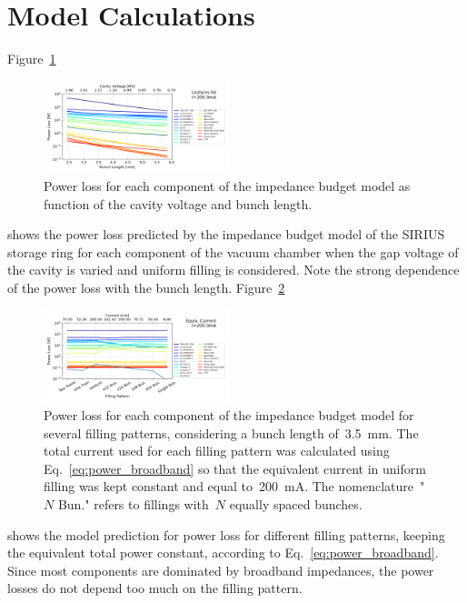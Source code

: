 \documentclass
[
    a4paper,
    nospread,     %
]{jacow}
\begin{document}
\section{Model Calculations}

    Figure~\ref{fig:model_vary_vgap}
    \begin{figure}
        \centering
        \includegraphics[width=0.48\textwidth]{THPC44_f1.png}
        \caption{Power loss for each component of the impedance budget model as function of the cavity voltage and bunch length.}
        \label{fig:model_vary_vgap}
    \end{figure}
     shows the power loss predicted by the impedance budget model of the SIRIUS storage ring for each component of the vacuum chamber when the gap voltage of the cavity is varied and uniform filling is considered. Note the strong dependence of the power loss with the bunch length. Figure~\ref{fig:model_vary_fillp}
    \begin{figure}
        \centering
        \includegraphics[width=0.48\textwidth]{THPC44_f2.png}
        \caption{Power loss for each component of the impedance budget model for several filling patterns, considering a bunch length of~\SI{3.5}{\milli\meter}. The total current used for each filling pattern was calculated using Eq.~\eqref{eq:power_broadband} so that the equivalent current in uniform filling was kept constant and equal to~\SI{200}{\milli\ampere}. The nomenclature~"$\!N$ Bun." refers to fillings with~$N$ equally spaced bunches.}
        \label{fig:model_vary_fillp}
    \end{figure}
     shows the model prediction for power loss for different filling patterns, keeping the equivalent total power constant, according to Eq.~\eqref{eq:power_broadband}. Since most components are dominated by broadband impedances, the power losses do not depend too much on the filling pattern.
    
\end{document}
